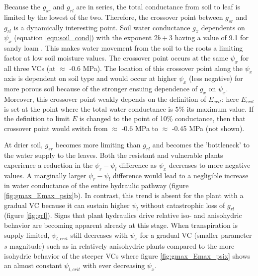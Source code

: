 \documentclass[utf8]{frontiersSCNS} %
\begin{document}
Because the $g_{sr}$ and $g_{rl}$ are in series, the total conductance from soil to leaf is limited by the lowest of the two. Therefore, the crossover point between $g_{sr}$ and $g_{rl}$ is a dynamically interesting point. Soil water conductance $g_x$ dependents on $\psi_x$ (equation \ref{eqn:soil_cond}) with the exponent $2b+3$ having a value of 9.1 for sandy loam \citep{campbell_introduction_2012}. This makes water movement from the soil to the roots a limiting factor at low soil moisture values. The crossover point occurs at the same $\psi_x$ for all three VCs (at $\approx$ -0.6 MPa). The location of this crossover point along the $\psi_x$ axis is dependent on soil type and would occur at higher $\psi_x$ (less negative) for more porous soil because of the stronger ensuing dependence of $g_x$ on $\psi_x$. Moreover, this crossover point weakly depends on the definition of $E_{crit}$: here $E_{crit}$ is set at the point where the total water conductance is 5\% its maximum value. If the definition to limit $E$ is changed to the point of 10\% conductance, then that crossover point would switch from $\approx$ -0.6 MPa to $\approx$ -0.45 MPa (not shown).

At drier soil, $g_{sr}$ becomes more limiting than $g_{rl}$ and becomes the 'bottleneck' to the water supply to the leaves. Both the resistant and vulnerable plants experience a reduction in the $\psi_r - \psi_l$ difference as $\psi_x$ decreases to more negative values. A marginally larger $\psi_r - \psi_l$ difference would lead to a negligible increase in water conductance of the entire hydraulic pathway (figure \ref{fig:gmax_Emax_psix}b). In contrast, this trend is absent for the plant with a gradual VC because it can sustain higher $\psi_l$ without catastrophic loss of $g_{rl}$ (figure \ref{fig:grl}). Signs that plant hydraulics drive relative iso- and anisohydric behavior are becoming apparent already at this stage. When transpiration is supply limited, $\psi_{l,crit}$ still decreases with $\psi_x$ for a gradual VC (smaller parameter $s$ magnitude) such as in relatively anisohydric plants compared to the more isohydric behavior of the steeper VCs where figure \ref{fig:gmax_Emax_psix} shows an almost constant $\psi_{l,crit}$ with ever decreasing $\psi_x$.

\end{document}

